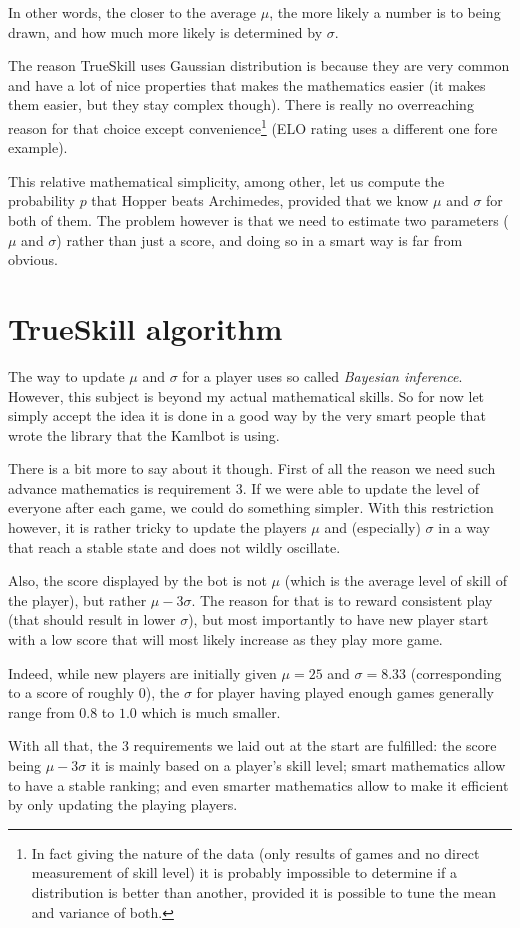 \documentclass[twocolumn]{article}
\begin{document}
In other words, the closer to the average $\mu$, the more likely a number is to being drawn, and how much more likely is determined by $\sigma$.

The reason TrueSkill uses Gaussian distribution is because they are very common and have a lot of nice properties that makes the mathematics easier (it makes them easier, but they stay complex though). There is really no overreaching reason for that choice except convenience\footnote{In fact giving the nature of the data (only results of games and no direct measurement of skill level) it is probably impossible to determine if a distribution is better than another, provided it is possible to tune the mean and variance of both.} (ELO rating uses a different one fore example).

This relative mathematical simplicity, among other, let us compute the probability $p$ that Hopper beats Archimedes, provided that we know $\mu$ and $\sigma$ for both of them. The problem however is that we need to estimate two parameters ($\mu$ and $\sigma$) rather than just a score, and doing so in a smart way is far from obvious.

\section{TrueSkill algorithm}

The way to update $\mu$ and $\sigma$ for a player uses so called \emph{Bayesian inference}. However, this subject is beyond my actual mathematical skills. So for now let simply accept the idea it is done in a good way by the very smart people that wrote the  library that the Kamlbot is using.

There is a bit more to say about it though. First of all the reason we need such advance mathematics is requirement 3. If we were able to update the level of everyone after each game, we could do something simpler. With this restriction however, it is rather tricky to update the players $\mu$ and (especially) $\sigma$ in a way that reach a stable state and does not wildly oscillate.

Also, the score displayed by the bot is not $\mu$ (which is the average level of skill of the player), but rather $\mu - 3 \sigma$. The reason for that is to reward consistent play (that should result in lower $\sigma$), but most importantly to have new player start with a low score that will most likely increase as they play more game.

Indeed, while new players are initially given $\mu = 25$ and $\sigma = 8.33$ (corresponding to a score of roughly $0$), the $\sigma$ for player having played enough games generally range from $0.8$ to $1.0$ which is much smaller.

With all that, the 3 requirements we laid out at the start are fulfilled: the score being $\mu - 3 \sigma$ it is mainly based on a player's skill level; smart mathematics allow to have a stable ranking; and even smarter mathematics allow to make it efficient by only updating the playing players.
\end{document}
